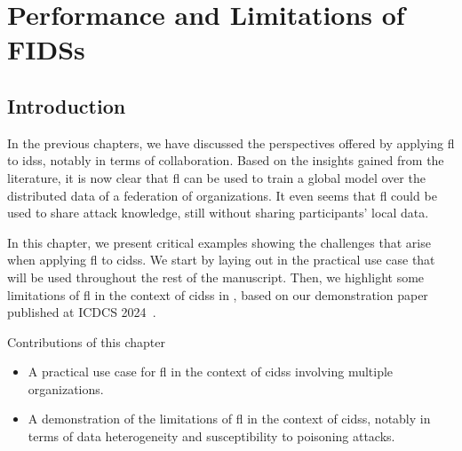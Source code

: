 \chapter{Performance and Limitations of FIDSs\label{chap:app}}

\section{Introduction\label{sec:app.intro}}

In the previous chapters, we have discussed the perspectives offered by applying \gls{fl} to \glspl{ids}, notably in terms of collaboration.
Based on the insights gained from the literature, it is now clear that \gls{fl} can be used to train a global model over the distributed data of a federation of organizations.
It even seems that \gls{fl} could be used to share attack knowledge, still without sharing participants' local data.

In this chapter, we present critical examples showing the challenges that arise when applying \gls{fl} to \glspl{cids}.
We start by laying out in  the practical use case that will be used throughout the rest of the manuscript.
Then, we highlight some limitations of \gls{fl} in the context of \glspl{cids} in , based on our demonstration paper published at ICDCS 2024~\cite{lavaur_icdcs_demo_2024}.

\begin{highlightbox}{Contributions of this chapter}
  \begin{itemize}[\textbullet, leftmargin=*, labelsep=10pt]
    \item A practical use case for \gls{fl} in the context of \glspl{cids} involving multiple organizations.
    \item A demonstration of the limitations of \gls{fl} in the context of \glspl{cids}, notably in terms of data heterogeneity and susceptibility to poisoning attacks.
  \end{itemize}
\end{highlightbox}






%


